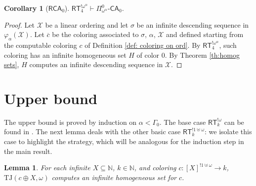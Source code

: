 \documentclass[11pt]{amsart}
\newtheorem{lemma}[thm]{Lemma}
\newtheorem{corollary}[thm]{Corollary}
\theoremstyle{definition}
\theoremstyle{remark}
\theoremstyle{plain}
\newcommand{\numberset}{\mathbb}
\newcommand{\N}{\numberset{N}}
\def\X{\mathcal{X}}
\def\om{\omega}
\def\a{\alpha}
\def\G{\Gamma}
\newcommand{\RCA}{\mathsf{RCA}_0}
\newcommand{\RT}{\mathsf{RT}}
\newcommand{\TJ}{\mathsf{TJ}}
\newcommand{\CA}{\mathsf{\text{-}CA}_0}
\def\TJ{{\textrm{TJ}}}
\def\N{{\mathbb{N}}}
\newcommand{\lorenzo}[1]{\textcolor{blue}{#1}}
\begin{document}
\begin{corollary}[$\RCA$]
$\RT_4^{!\om^\a} \vdash \Pi^0_{\om^\a} \CA$.
\end{corollary}

\begin{proof}
Let $\X$ be a linear ordering and let $\sigma$ be an infinite descending sequence in $\varphi_\a (\X)$.
Let $\overline{c}$ be the coloring associated to $\sigma$, $\a$, $\X$ and defined starting from the computable coloring $c$ of Definition \ref{def: coloring on ord}.
By $\RT_4^{!\om^\a}$, such coloring has an infinite homogeneous set $H$ of color 0.
By Theorem \ref{th:homog sets}, $H$ computes an infinite descending sequence in $\X$.
\end{proof}


%
%
%
%


\section{Upper bound}\label{sec:upper}


%
%
%
%


The upper bound is proved by induction on $\a < \G_0$.
The base case $\RT^{! \om}_k$ can be found in \cite[Theorem 3.7]{carlucci2014}.
The next lemma deals with the other basic case $\RT^{!1 \uplus \om}_k$: we isolate this case to highlight the strategy, which will be analogous for the induction step in the main result.

\begin{lemma}\label{upluslemma}
For each infinite $X \subseteq \N$, $k \in \N$, and coloring $c \colon [X]^{! 1 \uplus \omega} \to k$, $\TJ(c \oplus X,\om)$ computes an infinite homogeneous set for $c$.
\end{lemma}
\end{document}
